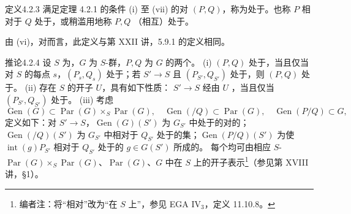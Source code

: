 \begin{SGAresult}{定义}{4.2.3}
满足定理 4.2.1 的条件 (i) 至 (vii) 的对 $(P,Q)$，称为处于。也称 $P$ 相对于 $Q$ 处于，或稍滥用地称 $P,Q$ （相互）处于。
\end{SGAresult}
由 (vi)，对而言，此定义与第 XXII 讲，5.9.1 的定义相同。
\begin{SGAresult}{推论}{4.2.4}
设 $S$ 为，$G$ 为 $S$-群，$P,Q$ 为 $G$ 的两个。
(i) $(P,Q)$ 处于，当且仅当对 $S$ 的每点 $s$，$(P_s,Q_s)$ 处于；若 $S'\to S$ 且 $(P_{S'},Q_{S'})$ 处于，则 $(P,Q)$ 处于。
(ii) 存在 $S$ 的开子 $U$，具有如下性质： $S'\to S$ 经由 $U$ ，当且仅当 $(P_{S'},Q_{S'})$ 处于。
(iii) 考虑
\[\operatorname{Gen}(G)\subset\operatorname{Par}(G)\times_S\operatorname{Par}(G),\quad\operatorname{Gen}(/Q)\subset\operatorname{Par}(G),\quad\operatorname{Gen}(P/Q)\subset G,\]
定义如下：对 $S'\to S$，$\operatorname{Gen}(G)(S')$ 为 $G_{S'}$ 中处于的对的；$\operatorname{Gen}(/Q)(S')$ 为 $G_{S'}$ 中相对于 $Q_{S'}$ 处于的集；$\operatorname{Gen}(P/Q)(S')$ 为使 $\operatorname{int}(g)P_{S'}$ 相对于 $Q_{S'}$ 处于的 $g\in G(S')$ 所成的。
每个均可由相应 $S$- $\operatorname{Par}(G)\times_S\operatorname{Par}(G)$、$\operatorname{Par}(G)$、$G$ 中在 $S$ 上的开子表示\footnote{编者注：将“相对”改为“在 $S$ 上”，参见 EGA IV$_3$，定义 11.10.8。}（参见第 XVIII 讲，§1）。
\end{SGAresult}
